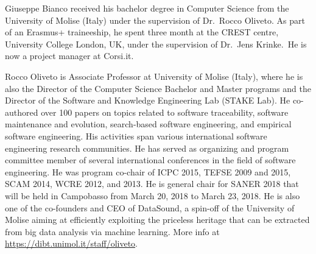 \documentclass[10pt,journal,compsoc]{IEEEtran}
\begin{document}
\begin{IEEEbiography}{Giuseppe Bianco}
  received his bachelor degree in Computer Science from the University
  of Molise (Italy) under the supervision of Dr.~Rocco Oliveto. As
  part of an Erasmus+ traineeship, he spent three month at the
  CREST centre, University College London, UK, under the supervision
  of Dr.~Jens Krinke.~He is now a project manager at Corsi.it.
\end{IEEEbiography}
\vspace{-0.5cm}

\begin{IEEEbiography}{Rocco Oliveto}
is Associate Professor at University of Molise (Italy), where he is also the Director of the Computer Science Bachelor and Master programs and the Director of the Software and Knowledge Engineering Lab (STAKE Lab). He co-authored over 100 papers on topics related to software traceability, software maintenance and evolution, search-based software engineering, and empirical software engineering. His activities span various international software engineering research communities. He has served as organizing and program committee member of several international conferences in the field of software engineering. He was program co-chair of ICPC 2015, TEFSE 2009 and 2015, SCAM 2014, WCRE 2012, and 2013. He is general chair for SANER 2018 that will be held in Campobasso from March 20, 2018 to March 23, 2018. He is also one of the co-founders and CEO of DataSound, a spin-off of the University of Molise aiming at efficiently exploiting the priceless heritage that can be extracted from big data analysis via machine learning. 
More info at \url{https://dibt.unimol.it/staff/oliveto}.
\end{IEEEbiography}
\vfill
\end{document}
